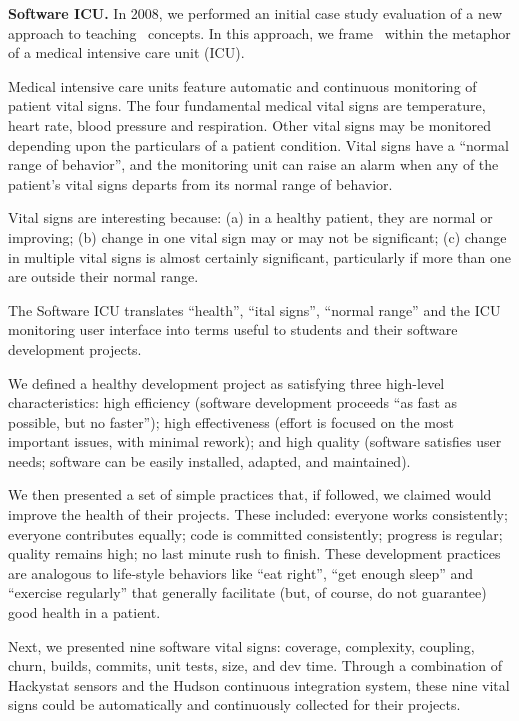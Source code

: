 {\bf Software ICU.}  In 2008, we performed an initial case study evaluation 
of a new approach to teaching \eCT\ concepts.  In this approach, we frame 
\eCT\ within the metaphor of a medical intensive care unit (ICU). 

Medical intensive care units feature automatic and continuous monitoring of
patient vital signs.  The four fundamental medical vital signs are
temperature, heart rate, blood pressure and respiration.  Other vital signs
may be monitored depending upon the particulars of a patient condition.
Vital signs have a ``normal range of behavior'', and the monitoring unit
can raise an alarm when any of the patient's vital signs departs from its
normal range of behavior.

Vital signs are interesting because: (a) in a healthy patient, they are
normal or improving; (b) change in one vital sign may or may not be
significant; (c) change in multiple vital signs is almost certainly
significant, particularly if more than one are outside their normal range.

The Software ICU translates ``health'', ``ital signs'', ``normal range''
and the ICU monitoring user interface into terms useful to students and their
software development projects.

We defined a healthy development project as satisfying three high-level
characteristics: high efficiency (software development proceeds ``as fast
as possible, but no faster''); high effectiveness (effort is focused on the
most important issues, with minimal rework); and high quality (software
satisfies user needs; software can be easily installed, adapted, and
maintained).

We then presented a set of simple practices that, if followed, we claimed
would improve the health of their projects.  These included: everyone works
consistently; everyone contributes equally; code is committed consistently;
progress is regular; quality remains high; no last minute rush to finish.
These development practices are analogous to life-style behaviors like
``eat right'', ``get enough sleep'' and ``exercise regularly'' that
generally facilitate (but, of course, do not guarantee) good health in a
patient.

Next, we presented nine software vital signs: coverage, complexity,
coupling, churn, builds, commits, unit tests, size, and dev time. Through a
combination of Hackystat sensors and the Hudson continuous integration
system, these nine vital signs could be automatically and continuously
collected for their projects.

